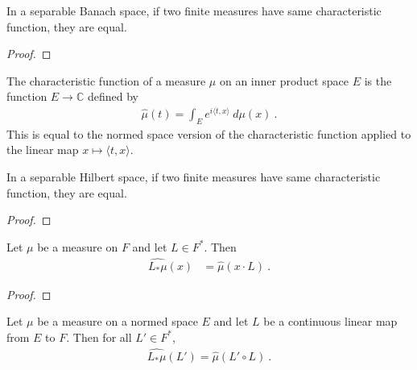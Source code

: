 \begin{theorem}\label{thm:ext_of_charFunDual}
  \mathlibok
In a separable Banach space, if two finite measures have same characteristic function, they are equal.
\end{theorem}

\begin{proof}\leanok

\end{proof}


\begin{definition}\label{def:charFun}
  \mathlibok
The characteristic function of a measure $\mu$ on an inner product space $E$ is the function $E \to \mathbb{C}$ defined by
\begin{align*}
  \hat{\mu}(t) = \int_E e^{i \langle t, x \rangle} \: d\mu(x) \: .
\end{align*}
This is equal to the normed space version of the characteristic function applied to the linear map $x \mapsto \langle t, x \rangle$.
\end{definition}


\begin{theorem}\label{thm:ext_of_charFun}
  \mathlibok
In a separable Hilbert space, if two finite measures have same characteristic function, they are equal.
\end{theorem}

\begin{proof}\leanok

\end{proof}


\begin{lemma}\label{lem:charFun_map_eq_charFunDual_smul}
  \mathlibok
Let $\mu$ be a measure on $F$ and let $L \in F^*$. Then
\begin{align*}
  \widehat{L_*\mu}(x) &= \hat{\mu}(x \cdot L) \: .
\end{align*}
\end{lemma}

\begin{proof}\leanok

\end{proof}


\begin{lemma}\label{lem:charFunDual_map}
  \mathlibok
Let $\mu$ be a measure on a normed space $E$ and let $L$ be a continuous linear map from $E$ to $F$.
Then for all $L' \in F^*$,
\begin{align*}
  \widehat{L_*\mu}(L') = \hat{\mu}(L' \circ L) \: .
\end{align*}
\end{lemma}


